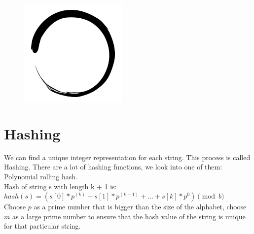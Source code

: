 \documentclass[12pt]{article}
\title{\vspace{-2em}\mytitle\vspace{-0.3em}}
\author{
    	\textbf{Editor}\\
    	Mehmet Altuner  \\ \ \\ 
    	\textbf{Reviewer} \\ Osman Karaketir
    }
\date{}
\begin{document}
    	
    	\begin{figure}
    		\centering
    		\includegraphics[width=\linewidth/4]{inzva-logo.png}
    		\label{fig:inzva}
    	\end{figure}
    	\maketitle
    	
    	\cleardoublepage
    	\tableofcontents
    	\cleardoublepage
    	
    	\section{Hashing}
    	We can find a unique integer representation for each string. This process is called Hashing. There are a lot of hashing functions, we look into one of them: Polynomial rolling hash. \\
    	
    	Hash of string s with length k + 1 is: $hash(s) = (s[0] * p^{(k)}+ s[1] * p ^ {(k-1)} + ... + s[k] * p^0) \pmod{b}$ \\
    
        Choose $p$ as a prime number that is bigger than the size of the alphabet, choose $m$ as a large prime number to ensure that the hash value of the string is unique for that particular string.
        
\end{document}
